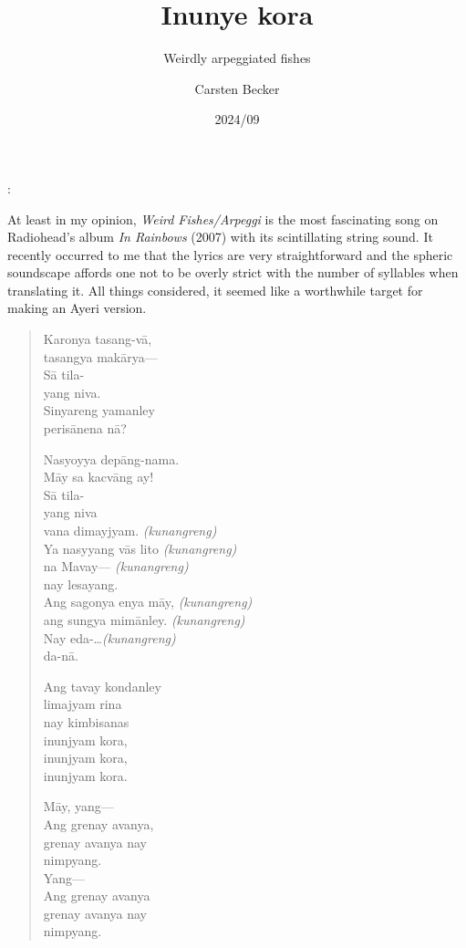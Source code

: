 \documentclass[12pt,paper=a4]{scrartcl}
\author{Carsten Becker}
\title{Inunye kora}
\subtitle{Weirdly arpeggiated fishes}
\date{2024/09} %
\newcommand{\tit}[1]{\textit{#1}} %
\newenvironment{mytitle}{
	\hfill
	\begin{minipage}{0.667\textwidth}
	\vspace{\baselineskip}
	\begin{center}
		\Large
		\sffamily\bfseries
		\makeatletter
}{
		\makeatother
	\end{center}
	\vspace{1em}
	\end{minipage}
	\hfill
}
\begin{document}

\begin{mytitle}
	\@title: \@subtitle
\end{mytitle}

At least in my opinion, \tit{Weird Fishes/Arpeggi} is the most fascinating song
on Radiohead's album \tit{In Rainbows} (2007) with its scintillating string
sound. It recently occurred to me that the lyrics are very straightforward and
the spheric soundscape affords one not to be overly strict with the number of
syllables when translating it. All things considered, it seemed like a
worthwhile target for making an Ayeri version.

\begin{quote}
\begin{multicols}{2}
Karonya tasang-vā,\\
tasangya makārya---\\
Sā tila-\\
yang niva.\\
Sinyareng yamanley\\
perisānena nā?

Nasyoyya depāng-nama.\\
Māy sa kacvāng ay!\\
Sā tila-\\
yang niva\\
vana dimayjyam.			\tab \textit{(kunangreng)}\\
Ya nasyyang vās lito	\tab \textit{(kunangreng)}\\
na Mavay---				\tab \textit{(kunangreng)}\\
nay lesayang.\\
Ang sagonya enya māy,	\tab \textit{(kunangreng)}\\
ang sungya mimānley.	\tab \textit{(kunangreng)}\\
Nay eda-\dots			\tab \textit{(kunangreng)}\\
da-nā.

\columnbreak

Ang tavay kondanley\\
limajyam rina\\
nay kimbisanas\\
inunjyam kora,\\
inunjyam kora,\\
inunjyam kora.

Māy, yang---\\
Ang grenay avanya,\\
grenay avanya nay\\
nimpyang.\\
Yang---\\
Ang grenay avanya\\
grenay avanya nay\\
nimpyang.
\end{multicols}


\end{quote}
\end{document}
